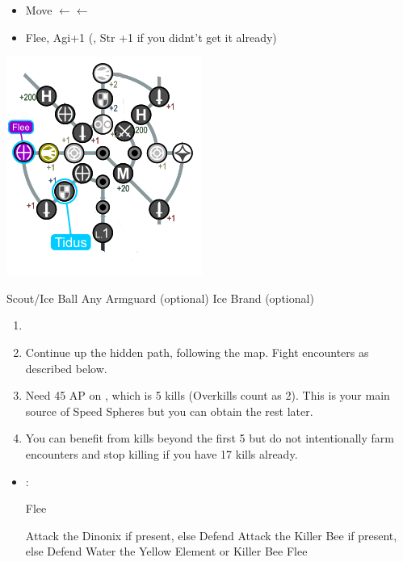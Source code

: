 \begin{spheregrid}
    \begin{itemize}
        \tidusf
        \begin{itemize}
            \item Move $\leftarrow\leftarrow$
            \item Flee, Agi+1 (, Str +1 if you didnt't get it already)
        \end{itemize}
    \end{itemize}
    \includegraphics{graphics/Tidus_Kilika}
\end{spheregrid}
\begin{equip}
    \begin{itemize}
        \wakkaf Scout/Ice Ball
        \wakkaf Any Armguard (optional)
        \tidusf Ice Brand (optional)
    \end{itemize}
\end{equip}
\begin{enumerate}[resume]
    \item \formation{\tidus}{\wakka}{\lulu}
    \item Continue up the hidden path, following the map. Fight encounters as described below.
    \item Need 45 AP on \tidus, which is 5 kills (Overkills count as 2). This is your main source of Speed Spheres but you can obtain the rest later.
    \item You can benefit from kills beyond the first 5 but do not intentionally farm encounters and stop killing if you have 17 kills already.
\end{enumerate}
\bothvfill\winvfill\lossvfill
\begin{encounters}
    \begin{itemize}
        \item {}:
            \begin{itemize}
                \tidusf Flee
            \end{itemize}
        \tidusf Attack the Dinonix if present, else Defend
        \wakkaf Attack the Killer Bee if present, else Defend
        \luluf Water the Yellow Element or Killer Bee
        \tidusf Flee
    \end{itemize}
\end{encounters}
